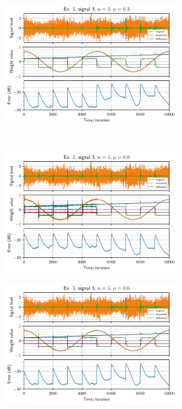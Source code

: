 \begin{figure}[h]
\begin{subfigure}[t]{0.30\columnwidth}
        \includegraphics[width=\columnwidth]{figures/pdf/ex1_l3_n3_mu30.pdf}
        \caption{}
    \end{subfigure} \\
    \begin{subfigure}[t]{0.30\columnwidth}
        \centering
        \includegraphics[width=\columnwidth]{figures/pdf/ex1_l3_n5_mu90.pdf}
        \caption{}
    \end{subfigure} \hfill
    \begin{subfigure}[t]{0.30\columnwidth}
        \centering
        \includegraphics[width=\columnwidth]{figures/pdf/ex1_l3_n5_mu60.pdf}

\end{subfigure}
\end{figure}
